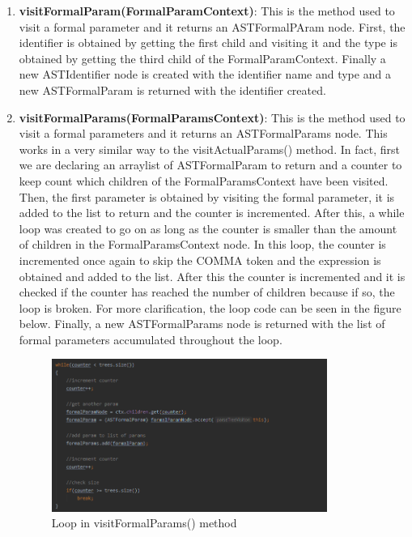 \documentclass{article}
\begin{document}
\begin{enumerate}
				\item \textbf{visitFormalParam(FormalParamContext)}:  This is the method used to visit a formal parameter and it returns an ASTFormalPAram node. First, the identifier is obtained by getting the first child and visiting it and the type is obtained by getting the third child of the FormalParamContext. Finally a new ASTIdentifier node is created with the identifier name and type and a new ASTFormalParam is returned with the identifier created.
				
			\item \textbf{visitFormalParams(FormalParamsContext)}: This is the method used to visit a formal parameters and it returns an ASTFormalParams node. This works in a very similar way to the visitActualParams() method. In fact, first we are declaring an arraylist of ASTFormalParam to return and a counter to keep count which children of the FormalParamsContext have been visited. Then, the first parameter is obtained by visiting the formal parameter, it is added to the list to return and the counter is incremented. After this, a while loop was created to go on as long as the counter is smaller than the amount of children in the FormalParamsContext node. In this loop, the counter is incremented once again to skip the COMMA token and the expression is obtained and added to the list. After this the counter is incremented and it is checked if the counter has reached the number of children because if so, the loop is broken. For more clarification, the loop code can be seen in the figure below. Finally, a new ASTFormalParams node is returned with the list of formal parameters accumulated throughout the loop.
				
				
						\begin{figure}[H]
					\centering
			 			\includegraphics[width=0.85\textwidth]{transformerfp.png}
			  			\caption{Loop in visitFormalParams() method}
			  			\label{fig:transformerfp}
					\end{figure}
				

\end{enumerate}
\end{document}
